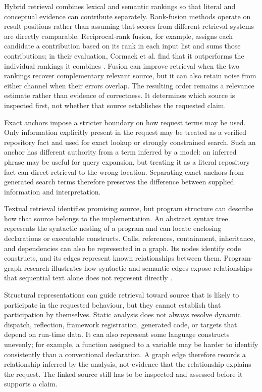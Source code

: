 Hybrid retrieval combines lexical and semantic rankings so that literal and conceptual evidence can contribute separately. Rank-fusion methods operate on result positions rather than assuming that scores from different retrieval systems are directly comparable. Reciprocal-rank fusion, for example, assigns each candidate a contribution based on its rank in each input list and sums those contributions; in their evaluation, Cormack et al. find that it outperforms the individual rankings it combines \cite{Cormack2009RRF}. Fusion can improve retrieval when the two rankings recover complementary relevant source, but it can also retain noise from either channel when their errors overlap. The resulting order remains a relevance estimate rather than evidence of correctness. It determines which source is inspected first, not whether that source establishes the requested claim.

Exact anchors impose a stricter boundary on how request terms may be used. Only information explicitly present in the request may be treated as a verified repository fact and used for exact lookup or strongly constrained search. Such an anchor has different authority from a term inferred by a model: an inferred phrase may be useful for query expansion, but treating it as a literal repository fact can direct retrieval to the wrong location. Separating exact anchors from generated search terms therefore preserves the difference between supplied information and interpretation.

Textual retrieval identifies promising source, but program structure can describe how that source belongs to the implementation. An abstract syntax tree represents the syntactic nesting of a program and can locate enclosing declarations or executable constructs. Calls, references, containment, inheritance, and dependencies can also be represented in a graph. Its nodes identify code constructs, and its edges represent known relationships between them. Program-graph research illustrates how syntactic and semantic edges expose relationships that sequential text alone does not represent directly \cite{Allamanis2018ProgramGraphs}.

Structural representations can guide retrieval toward source that is likely to participate in the requested behaviour, but they cannot establish that participation by themselves. Static analysis does not always resolve dynamic dispatch, reflection, framework registration, generated code, or targets that depend on run-time data. It can also represent some language constructs unevenly; for example, a function assigned to a variable may be harder to identify consistently than a conventional declaration. A graph edge therefore records a relationship inferred by the analysis, not evidence that the relationship explains the request. The linked source still has to be inspected and assessed before it supports a claim.

